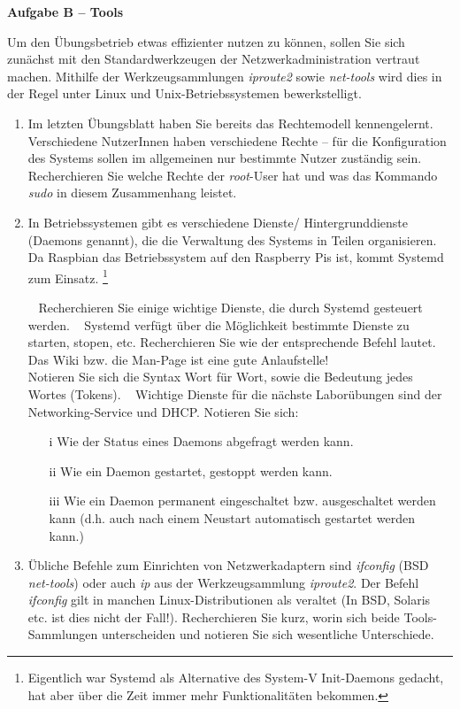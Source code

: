 \documentclass[paper=a4,fontsize=11pt]{scrartcl}%
\numberwithin{equation}{section}
\begin{document}
\begin{center}\Large{\textbf{Aufgabe B -- Tools}}\end{center}\vskip0.25in
Um den Übungsbetrieb etwas effizienter nutzen zu können, sollen Sie sich zunächst mit den Standardwerkzeugen der Netzwerkadministration vertraut machen. Mithilfe der Werkzeugsammlungen \emph{iproute2} sowie \emph{net-tools} wird dies in der Regel unter Linux und Unix-Betriebssystemen bewerkstelligt.
\begin{enumerate}
	\item Im letzten Übungsblatt haben Sie bereits das Rechtemodell kennengelernt. Verschiedene NutzerInnen haben verschiedene Rechte -- für die Konfiguration des Systems sollen im allgemeinen nur bestimmte Nutzer zuständig sein. Recherchieren Sie welche Rechte der \emph{root}-User hat und was das Kommando \emph{sudo} in diesem Zusammenhang leistet.
	\item In Betriebssystemen gibt es verschiedene Dienste/ Hintergrunddienste (Daemons genannt), die die Verwaltung des Systems in Teilen organisieren. Da Raspbian das Betriebssystem auf den Raspberry Pis ist, kommt Systemd zum Einsatz. \footnote{Eigentlich war Systemd als Alternative des System-V Init-Daemons gedacht, hat aber über die Zeit immer mehr Funktionalitäten bekommen.}
	\begin{tasks}
		\task~ Recherchieren Sie einige wichtige Dienste, die durch Systemd gesteuert werden.
		\task~ Systemd verfügt über die Möglichkeit bestimmte Dienste zu starten, stopen, etc. Recherchieren Sie wie der entsprechende Befehl lautet. Das Wiki bzw. die Man-Page ist eine gute Anlaufstelle!\\
		Notieren Sie sich die Syntax Wort für Wort, sowie die Bedeutung jedes Wortes (Tokens). 
		\task~ Wichtige Dienste für die nächste Laborübungen sind der Networking-Service und DHCP. Notieren Sie sich:
		\begin{itemize}
			\item[i] Wie der Status eines Daemons abgefragt werden kann.
			\item[ii] Wie ein Daemon gestartet, gestoppt werden kann.
			\item[iii] Wie ein Daemon permanent eingeschaltet bzw. ausgeschaltet werden kann (d.h. auch nach einem Neustart automatisch gestartet werden kann.)
		\end{itemize}
	\end{tasks}
	\item Übliche Befehle zum Einrichten von Netzwerkadaptern sind \emph{ifconfig} (BSD \emph{net-tools}) oder auch \emph{ip} aus der Werkzeugsammlung \emph{iproute2}. Der Befehl \emph{ifconfig} gilt in manchen Linux-Distributionen als veraltet (In BSD, Solaris etc. ist dies nicht der Fall!). Recherchieren Sie kurz, worin sich beide Tools-Sammlungen unterscheiden und notieren Sie sich wesentliche Unterschiede.\\

\end{enumerate}
\end{document}
